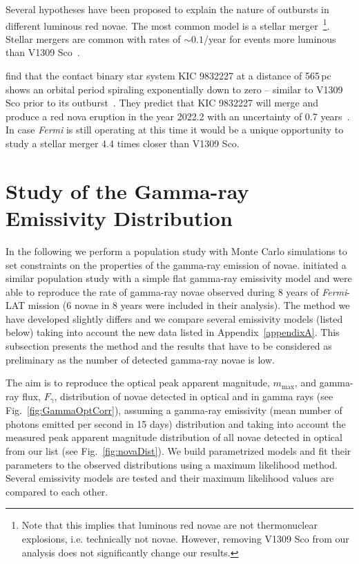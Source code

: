 \documentclass{aa} %
\newcommand{\Fermi}{\textit{Fermi}}
\begin{document}
Several hypotheses have been proposed to explain the nature of outbursts in different luminous red novae. The most common model is a stellar merger~\cite[see e.g.][]{2014ApJ...786...39N}\footnote{Note that this implies that luminous red novae are not thermonuclear explosions, i.e. technically not novae. However, removing V1309 Sco from our analysis does not significantly change our results.}. Stellar mergers are common with rates of $\sim0.1$/year for events more luminous than V1309 Sco~\citep{2014MNRAS.443.1319K}. 

\citet{2015AAS...22541505M} find that the contact binary star system KIC 9832227 at a distance of 565\,pc shows an orbital period spiraling exponentially down to zero -- similar to V1309 Sco prior to its outburst~\citep{2011A&A...528A.114T}. They predict that KIC 9832227 will merge and produce a red nova eruption in the year 2022.2 with an uncertainty of 0.7 years~\citep{2017ApJ...840....1M}. In case \textit{Fermi} is still operating at this time it would be a unique opportunity to study a stellar merger 4.4 times closer than V1309 Sco.


\section{Study of the Gamma-ray Emissivity Distribution}
\label{sec:pop} 

In the following we perform a population study with Monte Carlo simulations to set constraints on the properties of the gamma-ray emission of novae. \citet{2017MNRAS.465.1218M} initiated a similar population study with a simple flat gamma-ray emissivity model and were able to reproduce the rate of gamma-ray novae observed during 8 years of \Fermi-LAT mission (6 novae in 8 years were included in their analysis). The method we have developed slightly differs and we compare several emissivity models (listed below) taking into account the new data listed in Appendix~\ref{appendixA}. This subsection presents the method and the results that have to be considered as preliminary as the number of detected gamma-ray novae is low.

The aim is to reproduce the optical peak apparent magnitude, $m_{\textrm{max}}$, and gamma-ray flux, $F_{\gamma}$, distribution of novae detected in optical and in gamma rays (see Fig.~\ref{fig:GammaOptCorr}), assuming a gamma-ray emissivity (mean number of photons emitted per second in 15 days) distribution and taking into account the measured peak apparent magnitude distribution of all novae detected in optical from our list (see Fig.~\ref{fig:novaDist}). We build parametrized models and fit their parameters to the observed distributions using a maximum likelihood method. Several emissivity models are tested and their maximum likelihood values are compared to each other.
\end{document}
